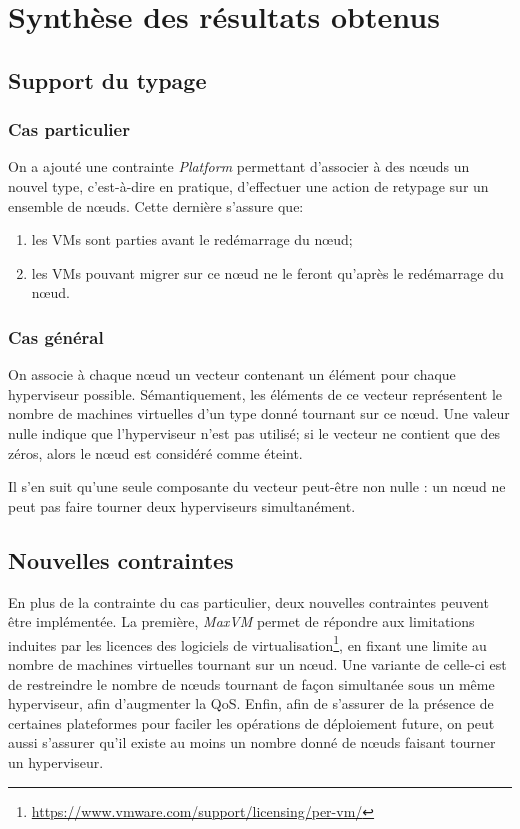 \documentclass[a4paper]{article}
\begin{document}
\section{Synthèse des résultats obtenus}
\subsection{Support du typage}
\subsubsection{Cas particulier}
On a ajouté une contrainte \textit{Platform} permettant d'associer à
des nœuds un nouvel type, c'est-à-dire en pratique, d'effectuer une
action de retypage sur un ensemble de nœuds. Cette dernière s'assure que:
\begin{enumerate}
	\item les VMs sont parties avant le redémarrage du nœud;
	\item les VMs pouvant migrer sur ce nœud ne le feront qu'après le
		redémarrage du nœud.
\end{enumerate}
\subsubsection{Cas général}
On associe à chaque nœud un vecteur contenant un élément pour
chaque hyperviseur possible. Sémantiquement, les éléments de ce
vecteur représentent le nombre de machines virtuelles d'un type donné
tournant sur ce nœud. Une valeur nulle indique que l'hyperviseur
n'est pas utilisé; si le vecteur ne contient que des zéros, alors
le nœud est considéré comme éteint.

Il s'en suit qu'une seule composante du vecteur peut-être non nulle :
un nœud ne peut pas faire tourner deux hyperviseurs simultanément.

\subsection{Nouvelles contraintes}
En plus de la contrainte du cas particulier, deux nouvelles
contraintes peuvent être implémentée. La première, \textit{MaxVM}
permet de répondre aux limitations induites par les licences des logiciels de
virtualisation\footnote{\url{https://www.vmware.com/support/licensing/per-vm/}},
en fixant une limite au nombre de machines virtuelles
tournant sur un nœud. Une variante de celle-ci est de restreindre
le nombre de nœuds tournant de façon simultanée sous un même
hyperviseur, afin d'augmenter la QoS. Enfin, afin de s'assurer de
la présence de certaines plateformes pour faciler les opérations de
déploiement future, on peut aussi s'assurer qu'il existe au moins
un nombre donné de nœuds faisant tourner un hyperviseur.
\end{document}

